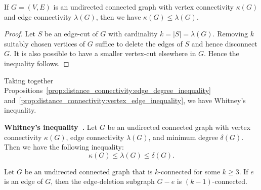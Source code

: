 


\begin{proposition}
\label{prop:distance_connectivity:vertex_edge_inequality}
If $G = (V,E)$ is an undirected connected graph with vertex
connectivity $\kappa(G)$ and edge connectivity $\lambda(G)$, then we
have $\kappa(G) \leq \lambda(G)$.
\end{proposition}

\begin{proof}
Let $S$ be an edge-cut of $G$ with cardinality
$k = |S| = \lambda(G)$. Removing $k$ suitably chosen vertices of $G$
suffice to delete the edges of $S$ and hence disconnect $G$. It is
also possible to have a smaller vertex-cut elsewhere in $G$. Hence the
inequality follows.
\end{proof}

Taking together
Propositions~\ref{prop:distance_connectivity:edge_degree_inequality}
and~\ref{prop:distance_connectivity:vertex_edge_inequality}, we have
Whitney's inequality.

\begin{theorem}
\textbf{Whitney's inequality~\cite{Whitney1932}.}
Let $G$ be an undirected connected graph with vertex connectivity
$\kappa(G)$, edge connectivity $\lambda(G)$, and minimum degree
$\delta(G)$. Then we have the following inequality:
\[
\kappa(G)
\leq
\lambda(G)
\leq
\delta(G).
\]
\end{theorem}

\begin{proposition}
\label{prop:distance_connectivity:edge_removal_subgraph_k_minus_1_connected}
Let $G$ be an undirected connected graph that is $k$-connected for
some $k \geq 3$. If $e$ is an edge of $G$, then the edge-deletion
subgraph $G - e$ is $(k - 1)$-connected.
\end{proposition}

